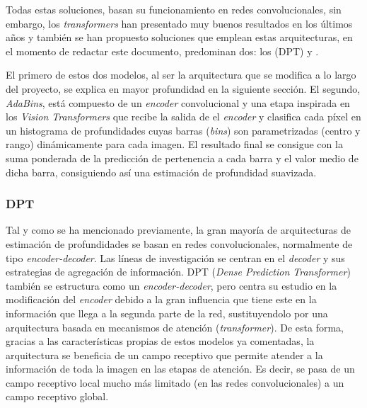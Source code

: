 Todas estas soluciones, basan su funcionamiento en redes convolucionales, sin embargo, los \textit{transformers} han presentado muy buenos resultados en los últimos años y también se han propuesto soluciones que emplean estas arquitecturas, en el momento de redactar este documento, predominan dos: los  (DPT) \cite{visiontransformersDPT} y  \cite{bhat2020adabins}.

El primero de estos dos modelos, al ser la arquitectura que se modifica a lo largo del proyecto, se explica en mayor profundidad en la siguiente sección. El segundo, \textit{AdaBins}, está compuesto de un \textit{encoder} convolucional y una etapa inspirada en los \textit{Vision Transformers} \cite{image16x16words} que recibe la salida de el \textit{encoder} y clasifica cada píxel en un histograma de profundidades cuyas barras (\textit{bins}) son parametrizadas (centro y rango) dinámicamente para cada imagen. El resultado final se consigue con la suma ponderada de la predicción de pertenencia a cada barra y el valor medio de dicha barra, consiguiendo así una estimación de profundidad suavizada.


\subsubsection{DPT}
Tal y como se ha mencionado previamente, la gran mayoría de arquitecturas de estimación de profundidades se basan en redes convolucionales, normalmente de tipo \textit{encoder-decoder}. Las líneas de investigación se centran en el \textit{decoder} y sus estrategias de agregación de información. DPT (\textit{Dense Prediction Transformer}) \cite{visiontransformersDPT} también se estructura como un \textit{encoder-decoder}, pero centra su estudio en la modificación del \textit{encoder} debido a la gran influencia que tiene este en la información que llega a la segunda parte de la red, sustituyendolo por una arquitectura basada en mecanismos de atención (\textit{transformer}). De esta forma, gracias a las características propias de estos modelos ya comentadas, la arquitectura se beneficia de un campo receptivo que permite atender a la información de toda la imagen en las etapas de atención. Es decir, se pasa de un campo receptivo local mucho más limitado (en las redes convolucionales) a un campo receptivo global.

